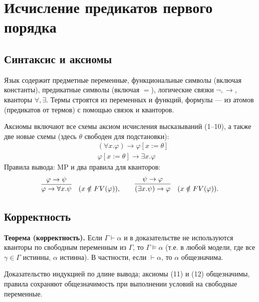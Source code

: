 \documentclass[10pt]{article}
\begin{document}
\section{Исчисление предикатов первого порядка}
\subsection{Синтаксис и аксиомы}
Язык содержит предметные переменные, функциональные символы (включая константы), предикатные символы (включая $=$), логические связки $\neg,\rightarrow$, кванторы $\forall,\exists$.
Термы строятся из переменных и функций, формулы — из атомов (предикатов от термов) с помощью связок и кванторов.

Аксиомы включают все схемы аксиом исчисления высказываний (1–10), а также две новые схемы (здесь $\theta$ свободен для подстановки):
\begin{align}
  &(\forall x.\varphi) \rightarrow \varphi[x:=\theta] \tag{11}\\
  &\varphi[x:=\theta] \rightarrow \exists x.\varphi \tag{12}
\end{align}
Правила вывода: MP и два правила для кванторов:
\[
\infer{\varphi\rightarrow\forall x.\psi}{\varphi\rightarrow\psi}\quad (x\notin FV(\varphi)),\qquad
\infer{(\exists x.\psi)\rightarrow\varphi}{\psi\rightarrow\varphi}\quad (x\notin FV(\varphi)).
\]

\subsection{Корректность}
\textbf{Теорема (корректность).} Если $\Gamma\vdash\alpha$ и в доказательстве не используются кванторы по свободным переменным из $\Gamma$, то $\Gamma\models\alpha$ (т.е. в любой модели, где все $\gamma\in\Gamma$ истинны, $\alpha$ истинна). В частности, если $\vdash\alpha$, то $\alpha$ общезначима.

Доказательство индукцией по длине вывода; аксиомы (11) и (12) общезначимы, правила сохраняют общезначимость при выполнении условий на свободные переменные.
\end{document}
